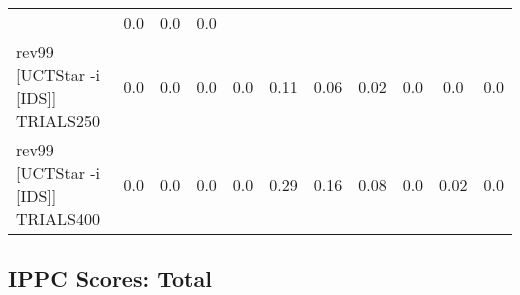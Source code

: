 \documentclass{article}
\begin{document}
\begin{tabular}{|l|r@{$\pm$}rr@{$\pm$}rr@{$\pm$}rr@{$\pm$}rr@{$\pm$}rr@{$\pm$}rr@{$\pm$}rr@{$\pm$}rr@{$\pm$}rr@{$\pm$}r|}
& \multicolumn{2}{c}{0.0}
& \multicolumn{2}{c}{0.0}
& \multicolumn{2}{c|}{0.0}
\\
rev99 [UCTStar -i [IDS]] TRIALS250
& \multicolumn{2}{c}{0.0}
& \multicolumn{2}{c}{0.0}
& \multicolumn{2}{c}{0.0}
& \multicolumn{2}{c}{0.0}
& \multicolumn{2}{c}{0.11}
& \multicolumn{2}{c}{0.06}
& \multicolumn{2}{c}{0.02}
& \multicolumn{2}{c}{0.0}
& \multicolumn{2}{c}{0.0}
& \multicolumn{2}{c|}{0.0}
\\
rev99 [UCTStar -i [IDS]] TRIALS400
& \multicolumn{2}{c}{0.0}
& \multicolumn{2}{c}{0.0}
& \multicolumn{2}{c}{0.0}
& \multicolumn{2}{c}{0.0}
& \multicolumn{2}{c}{0.29}
& \multicolumn{2}{c}{0.16}
& \multicolumn{2}{c}{0.08}
& \multicolumn{2}{c}{0.0}
& \multicolumn{2}{c}{0.02}
& \multicolumn{2}{c|}{0.0}
\\
\hline
\end{tabular}%

\bigskip

\subsection*{IPPC Scores: Total}
\end{document}
